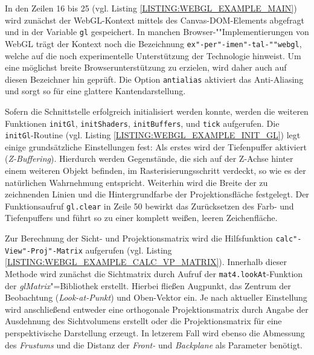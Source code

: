 In den Zeilen 16 bis 25 (vgl. Listing \ref{LISTING:WEBGL_EXAMPLE_MAIN}) wird zunächst der WebGL-Kontext mittels des Canvas-DOM-Elements abgefragt und in der Variable \texttt{gl} gespeichert. In manchen Browser-""Implementierungen von WebGL trägt der Kontext noch die Bezeichnung \texttt{ex"-per"-imen"-tal-""webgl}, welche auf die noch experimentelle Unterstützung der Technologie hinweist. Um eine möglichst breite Browserunterstützung zu erzielen, wird daher auch auf diesen Bezeichner hin geprüft. Die Option \texttt{antialias} aktiviert das Anti-Aliasing und sorgt so für eine glattere Kantendarstellung.

Sofern die Schnittstelle erfolgreich initialisiert werden konnte, werden die weiteren Funktionen \texttt{initGl}, \texttt{initShaders}, \texttt{initBuffers}, und \texttt{tick} aufgerufen. Die \texttt{initGl}-Routine (vgl. Listing \ref{LISTING:WEBGL_EXAMPLE_INIT_GL}) legt einige grundsätzliche Einstellungen fest:
Als erstes wird der Tiefenpuffer aktiviert (\emph{Z-Buffering}). Hierdurch werden Gegenstände, die sich auf der Z-Achse hinter einem weiteren Objekt befinden, im Rasterisierungsschritt verdeckt, so wie es der natürlichen Wahrnehmung entspricht. Weiterhin wird die Breite der zu zeichnenden Linien und die Hintergrundfarbe der Projektionsfläche festgelegt. Der Funktionsaufruf \texttt{gl.clear} in Zeile 50 bewirkt das Zurücksetzen des Farb- und Tiefenpuffers und führt so zu einer komplett weißen, leeren Zeichenfläche.

\smallskip
\begin{listing}[!h]
\caption{Initialisierung des WebGL-Kontexts.}
\label{LISTING:WEBGL_EXAMPLE_INIT_GL}
\end{listing}

\vspace{1ex}

\begin{listing}[!h]
\caption{Berechnung der Sicht-Projektions-Matrix.}
\label{LISTING:WEBGL_EXAMPLE_CALC_VP_MATRIX}
\end{listing}

Zur Berechnung der Sicht- und Projektionsmatrix wird die Hilfsfunktion \texttt{calc"-View"-Proj"-Matrix} aufgerufen (vgl. Listing \ref{LISTING:WEBGL_EXAMPLE_CALC_VP_MATRIX}). Innerhalb dieser Methode wird zunächst die Sichtmatrix durch Aufruf der \texttt{mat4.lookAt}-Funktion der \emph{glMatrix}"=Bibliothek erstellt. Hierbei fließen Augpunkt, das Zentrum der Beobachtung (\emph{Look-at-Punkt}) und Oben-Vektor ein. Je nach aktueller Einstellung wird anschließend entweder eine orthogonale Projektionsmatrix durch Angabe der Ausdehnung des Sichtvolumens erstellt oder die Projektionsmatrix für eine perspektivische Darstellung erzeugt. In letzerem Fall wird ebenso die Abmessung des \emph{Frustums} und die Distanz der \emph{Front-} und \emph{Backplane} als Parameter benötigt.

